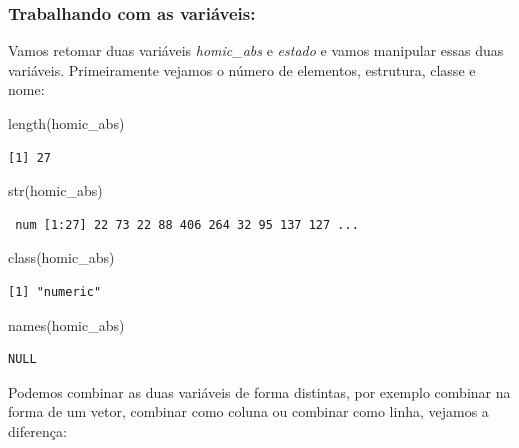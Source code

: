 \documentclass[
  letterpaper,
  DIV=11,
  numbers=noendperiod]{scrreprt}
\newenvironment{Shaded}{\begin{snugshade}}{\end{snugshade}}
\newcommand{\FunctionTok}[1]{\textcolor[rgb]{0.28,0.35,0.67}{#1}}
\newcommand{\NormalTok}[1]{\textcolor[rgb]{0.00,0.23,0.31}{#1}}
\begin{document}
\subsubsection{Trabalhando com as
variáveis:}\label{trabalhando-com-as-variuxe1veis}

Vamos retomar duas variáveis \emph{homic\_abs} e \emph{estado} e vamos
manipular essas duas variáveis. Primeiramente vejamos o número de
elementos, estrutura, classe e nome:

\begin{Shaded}
\begin{Highlighting}[]
\FunctionTok{length}\NormalTok{(homic\_abs) }
\end{Highlighting}
\end{Shaded}

\begin{verbatim}
[1] 27
\end{verbatim}

\begin{Shaded}
\begin{Highlighting}[]
\FunctionTok{str}\NormalTok{(homic\_abs)    }
\end{Highlighting}
\end{Shaded}

\begin{verbatim}
 num [1:27] 22 73 22 88 406 264 32 95 137 127 ...
\end{verbatim}

\begin{Shaded}
\begin{Highlighting}[]
\FunctionTok{class}\NormalTok{(homic\_abs)  }
\end{Highlighting}
\end{Shaded}

\begin{verbatim}
[1] "numeric"
\end{verbatim}

\begin{Shaded}
\begin{Highlighting}[]
\FunctionTok{names}\NormalTok{(homic\_abs) }
\end{Highlighting}
\end{Shaded}

\begin{verbatim}
NULL
\end{verbatim}

Podemos combinar as duas variáveis de forma distintas, por exemplo
combinar na forma de um vetor, combinar como coluna ou combinar como
linha, vejamos a diferença:
\end{document}
